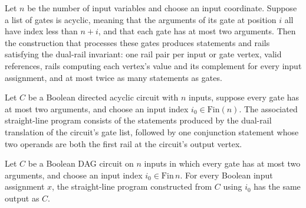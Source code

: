 \begin{theorem}
\label{BoolCircuit.StraightLine.dualRail_inv}
\leanok
{}
Let $n$ be the number of input variables and choose an input coordinate. Suppose a list
of gates is acyclic, meaning that the arguments of its gate at position $i$ all have
index less than $n+i$, and that each gate has at most two arguments. Then the
construction that processes these gates produces statements and rails satisfying the
dual-rail invariant: one rail pair per input or gate vertex, valid references, rails
computing each vertex's value and its complement for every input assignment, and at most
twice as many statements as gates.
\end{theorem}

\begin{definition}
\label{BoolCircuit.DAGCircuit.toStraightLine}
\leanok
{}
Let $C$ be a Boolean directed acyclic circuit with $n$ inputs, suppose every gate has at
most two arguments, and choose an input index $i_0\in\mathrm{Fin}(n)$. The associated
straight-line program consists of the statements produced by the dual-rail translation
of the circuit's gate list, followed by one conjunction statement whose two operands are
both the first rail at the circuit's output vertex.
\end{definition}

\begin{theorem}
\label{BoolCircuit.DAGCircuit.toStraightLine_eval}
\leanok
{}
Let $C$ be a Boolean DAG circuit on $n$ inputs in which every gate has at most two
arguments, and choose an input index $i_0\in\mathrm{Fin}\,n$. For every Boolean input
assignment $x$, the straight-line program constructed from $C$ using $i_0$ has the same
output as $C$.
\end{theorem}

